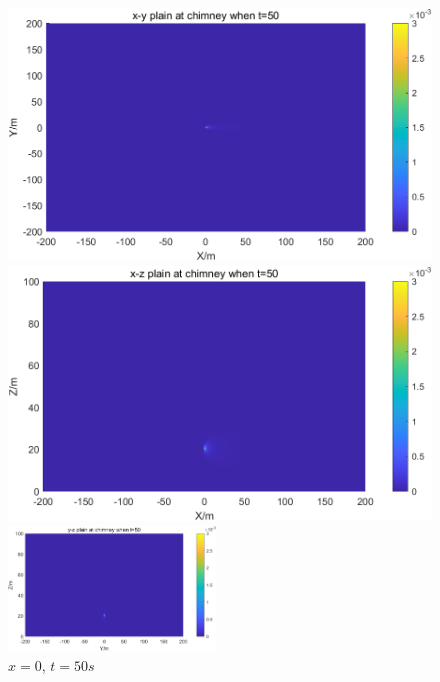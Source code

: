 \documentclass{article}
\begin{document}
	\begin{figure}[htbp]
		\begin{minipage}{0.49\textwidth}
			\includegraphics[width=\textwidth]{pics/default-x-y,t=50.png}
			\caption{$z=h$, $t=50s$}
			\label{fig9}
		\end{minipage}
		\begin{minipage}{0.49\textwidth}
			\includegraphics[width=\textwidth]{pics/default-x-z,t=50.png}
			\caption{$y=0$, $t=50s$}
			\label{fig10}
		\end{minipage}
		\centering
		\includegraphics[width=0.49\textwidth]{pics/default-y-z,t=50.png}
		\caption{$x=0$, $t=50s$}
		\label{fig11}
	\end{figure}
\end{document}
